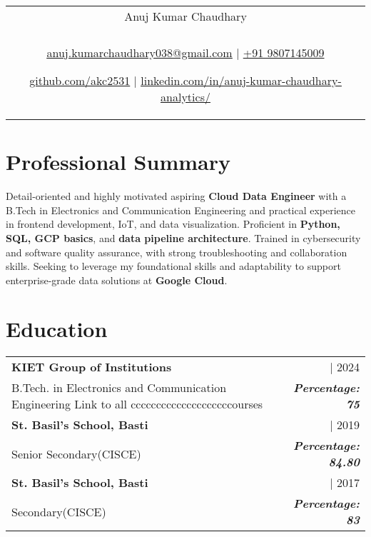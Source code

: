 \documentclass[a4paper,8pt]{article}
\begin{document}
\pagestyle{empty} 


\begin{tabularx}{\linewidth}{@{} C @{}}
\color[HTML]{1C033C} \Huge{Anuj Kumar Chaudhary} \\[6pt]
\\
\textcolor[HTML]{371e77}{\underline{\href{mailto:anuj.kumarchaudhary038@gmail.com}{\raisebox{-0.05\height}{\faEnvelope} anuj.kumarchaudhary038@gmail.com}} $|$}
\textcolor[HTML]{371e77}{\href{tel:+919807145009}{\raisebox{-0.05\height}{\faMobile} +91 9807145009}}

\textcolor[HTML]{371e77}{\underline{\href{https://github.com/akc2531}{\raisebox{-0.05\height}{\faGithub} github.com/akc2531}} $|$}
\textcolor[HTML]{371e77}{\underline{\href{https://www.linkedin.com/in/anuj-kumar-chaudhary-analytics/}{\raisebox{-0.05\height}{\faLinkedin} linkedin.com/in/anuj-kumar-chaudhary-analytics/}}}
\end{tabularx}
\section*{Professional Summary}
Detail-oriented and highly motivated aspiring \textbf{Cloud Data Engineer} with a B.Tech in Electronics and Communication Engineering and practical experience in frontend development, IoT, and data visualization. Proficient in \textbf{Python, SQL, GCP basics}, and \textbf{data pipeline architecture}. Trained in cybersecurity and software quality assurance, with strong troubleshooting and collaboration skills. Seeking to leverage my foundational skills and adaptability to support enterprise-grade data solutions at \textbf{Google Cloud}.

\section{Education}
\begin{tabularx}{\linewidth}{ @{}l r@{} }
\color[HTML]{1C033C} \textbf{KIET Group of Institutions} & \hfill \color[HTML]{371e77} | 2024 \\
\color[HTML]{371e77} B.Tech. in Electronics and Communication Engineering {{{}{Link to all ccccccccccccccccccccourses}}} & \hfill \color[HTML]{4B28A4} \textit{\textbf{Percentage: 75}} \\
\color[HTML]{1C033C} \textbf{St. Basil's School, Basti} & \hfill \color[HTML]{371e77} | 2019 \\
\color[HTML]{371e77} Senior Secondary(CISCE)  & \hfill \color[HTML]{4B28A4} \textit{\textbf{Percentage: 84.80}} \\
\color[HTML]{1C033C} \textbf{St. Basil's School, Basti} & \hfill \color[HTML]{371e77} | 2017 \\
\color[HTML]{371e77} Secondary(CISCE)  & \hfill \color[HTML]{4B28A4} \textit{\textbf{Percentage: 83}} \\
\end{tabularx}
\end{document}

